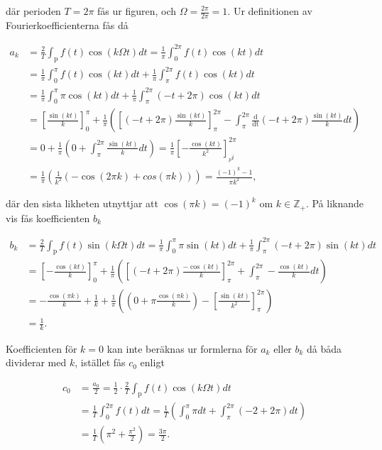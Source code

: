 \documentclass[a4paper]{article}
\begin{document}
\noindent där perioden $T = 2\pi$ fås ur figuren, och $\Omega =
\frac{2\pi}{2\pi} = 1$. Ur definitionen av Fourierkoefficienterna fås då

\setlength{\jot}{10pt}
\begin{align*}
  a_k &= \frac{2}{T}\int_{\text{p}}f(t)\cos(k\Omega t) dt = \frac{1}{\pi}\int_0^{2\pi}f(t)\cos(kt)dt\\
      &= \frac{1}{\pi}\int_0^{\pi}f(t)\cos(kt)dt + \frac{1}{\pi}\int_{\pi}^{2\pi}f(t)\cos(kt)dt\\
      &= \frac{1}{\pi}\int_0^{\pi}\pi\cos(kt)dt + \frac{1}{\pi}\int_{\pi}^{2\pi}(-t + 2\pi)\cos(kt)dt\\
      & = \left[ \frac{\sin(kt)}{k} \right]_0^{\pi} + \frac{1}{\pi}\left( \left[ (-t + 2\pi)\frac{\sin(kt)}{k} \right]_{\pi}^{2\pi} - \int_{\pi}^{2\pi}\frac{\text{d}}{\text{dt}}(-t + 2\pi)\frac{\sin(kt)}{k}dt \right)\\
      &= 0 + \frac{1}{\pi}\left( 0 + \int_{\pi}^{2\pi}\frac{\sin(kt)}{k}dt \right) = \frac{1}{\pi}\left[ -\frac{\cos(kt)}{k^2} \right]_{_pi}^{2\pi}\\
  &= \frac{1}{\pi}\left( \frac{1}{k^2}(-\cos(2\pi k) + cos(\pi k)) \right) = \frac{(-1)^k - 1}{\pi k^2},
\end{align*}

\noindent där den sista likheten utnyttjar att $\cos(\pi k) = (-1)^k$ om $k \in
\mathbb{Z}_+$. På liknande vis fås koefficienten $b_k$

\begin{align*}
  b_k &= \frac{2}{T}\int_{\text{p}}f(t)\sin(k\Omega t)dt = \frac{1}{\pi}\int_0^{\pi}\pi\sin(kt)dt + \frac{1}{\pi}\int_{\pi}^{2\pi}(-t + 2\pi)\sin(kt)dt\\
      &= \left[ -\frac{\cos(kt)}{k} \right]_0^{\pi} + \frac{1}{\pi}\left( \left[ (-t+2\pi)\frac{-\cos(kt)}{k} \right]_{\pi}^{2\pi} + \int_{\pi}^{2\pi}-\frac{\cos(kt)}{k}dt \right)\\
      &= -\frac{\cos(\pi k)}{k} + \frac{1}{k} + \frac{1}{\pi}\left( \left( 0 + \pi\frac{\cos(\pi k)}{k} \right) - \left[ \frac{\sin(kt)}{k^2} \right]_{\pi}^{2\pi} \right)\\
  &= \frac{1}{k}.
\end{align*}

\noindent Koefficienten för $k = 0$ kan inte beräknas ur formlerna för $a_k$
eller $b_k$ då båda dividerar med $k$, istället fås $c_0$ enligt

\begin{align*}
  c_0 &= \frac{a_0}{2} = \frac 12 \cdot \frac 2T \int_{\text{p}}f(t)\cos(k\Omega t)dt\\
  &= \frac 1T \int_0^{2\pi}f(t)dt = \frac 1T \left( \int_0^{\pi}\pi dt + \int_\pi^{2\pi}(-2 + 2\pi) dt \right)\\
  &= \frac 1T \left( \pi^2 + \frac{\pi^2}{2} \right) = \frac{3\pi}{2}.
\end{align*}
\end{document}
